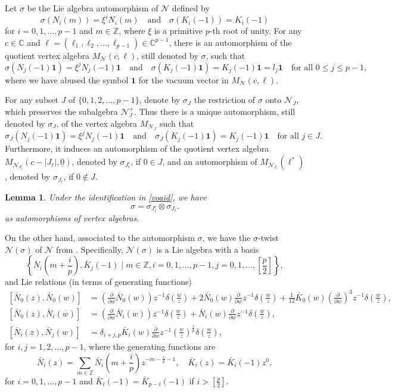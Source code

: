 \documentclass[12pt, reqno]{amsart}
\numberwithin{equation}{section}
\newtheorem{lemma}[theorem]{Lemma}%
\numberwithin{equation}{section}
\def\({\left(}
\def\){\right)}
\def\p{\partial}
\newcommand{\C}{\mathbb C}
\newcommand{\Z}{\mathbb{Z}}
\newcommand{\CN}{\mathcal{N}}
\newcommand{\un}[1]{\underline{#1}}
\begin{document}
Let $\sigma$ be the Lie algebra automorphism of $\CN$ defined by
\[
\sigma(N_i(m))=\xi^i N_i(m)\quad \text{and}\quad
\sigma(K_i(-1))=K_i(-1)
\]
for $i=0,1,\dots,p-1$ and $m\in \Z$,
where $\xi$ is a primitive $p$-th root of unity.
For any $c\in \C$ and ${\bm\ell}=(\ell_1,\ell_2,\dots,\ell_{p-1})\in \C^{p-1}$,
there is an automorphism of the quotient vertex algebra $M_\CN(c,\bm\ell)$,
still denoted by $\sigma$, such that
\[
\sigma(N_j(-1){\bm 1})=\xi^j N_j(-1){\bm 1}\quad\text{and}\quad
\sigma(K_j(-1){\bm 1})=K_j(-1){\bm 1}=l_j\bm1 \quad\text{for all } 0\le j\le p-1,
\]
where we have abused the symbol $\bm1$ for the vacuum vector in $M_\CN(c,\bm\ell)$.


For any subset $J$ of $\{0,1,2,\dots,p-1\}$, denote by $\sigma_J$ the restriction of $\sigma$ onto $\CN_J$,
which preserves the subalgebra $\CN_J^+$.
Thus there is a unique automorphism, still denoted by $\sigma_J$,
of the vertex algebra $M_{\CN_J}$ such that
\[
\sigma_J(N_j(-1){\bm 1})=\xi^j N_j(-1){\bm 1}\quad\text{and}\quad
\sigma_J(K_j(-1){\bm 1})=K_j(-1){\bm 1} \quad\text{for all } j\in J.
\]
Furthermore, it induces an automorphism of the quotient vertex algebra
$M_{\mathcal{N}_{J_{\bm\ell}^c}}(c-|J_{\bm{\ell}}|,{\un 0})$, denoted by $\sigma_{J_{\bm{\ell}}^c}$,
if $0\in J$,
and an automorphism of $M_{\mathcal{N}_{J_{\bm{\ell}}}}(\bm{\ell}^*)$,
denoted by $\sigma_{J_{\bm{\ell}}}$, if $0\notin J$.


\begin{lemma}\label{autiden}
Under the identification in \eqref{voaid}, we have
\[\sigma=\sigma_{J_{\bm{\ell}}^c}\otimes \sigma_{J_{\bm{\ell}}}.\]
as automorphisms of vertex algebras.
\end{lemma}


On the other hand, associated to the automorphism $\sigma$, we have the  $\sigma$-twist $\CN(\sigma)$ of $\CN$ from \cite{BL}.
Specifically, $\CN(\sigma)$ is a Lie algebra with a basis
\[
\left\{\bar{N}_i(m+\frac{i}{p}), \bar{K}_j(-1) \mid m\in \Z, i=0,1,\dots,p-1, j=0,1,\dots, [\frac{p}{2}]\right\},
\]
and Lie relations (in terms of generating functions)
\begin{equation*}\begin{split}
[\bar{N}_0(z),\bar{N}_0(w)]&=\(\frac{\p}{\p w}\bar{N}_0(w)\)z^{-1}\delta\(\frac{w}{z}\)
+2\bar{N}_0(w)\frac{\p}{\p w}z^{-1}\delta\(\frac{w}{z}\)
 +\frac{1}{12}\bar{K}_0(w)\(\frac{\p}{\p w}\)^3z^{-1}\delta\(\frac{w}{z}\),\\
[\bar{N}_0(z),\bar{N}_i(w)]&=\(\frac{\p}{\p w}\bar{N}_i(w)\)z^{-1}\delta\(\frac{w}{z}\)+\bar{N}_i(w)\frac{\p}{\p w}z^{-1}\delta\(\frac{w}{z}\),
\\
[\bar{N}_i(z),\bar{N}_j(w)]&=\delta_{i+j,p}\bar{K}_i(w)\frac{\p}{\p w}z^{-1}\(\frac{w}{z}\)^{\frac{i}{p}}\delta\(\frac{w}{z}\),
\end{split}
\end{equation*}
for $i,j=1,2,\dots,p-1$, where the generating functions are
\[
\bar{N}_i(z)=
\sum_{m\in \Z}\bar{N}_i(m+\frac{i}{p})z^{-m-\frac{i}{p}-1},\quad
\bar{K}_i(z)=\bar{K}_i(-1)z^0,
\]
for $i=0,1,\dots,p-1$ and $\bar{K}_i(-1)=\bar{K}_{p-i}(-1)$ if $i>[\frac{p}{2}]$.
\end{document}
